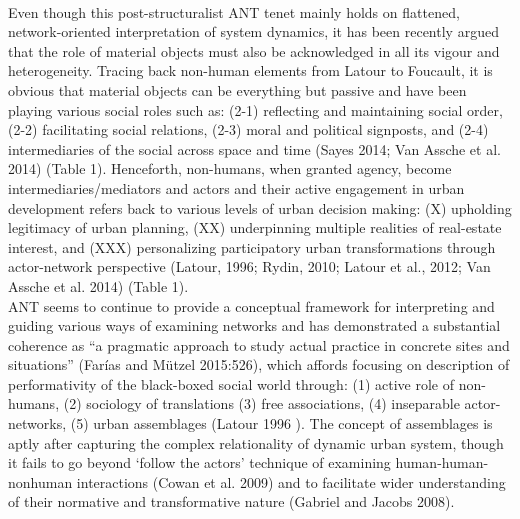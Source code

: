 \documentclass[11pt]{report}
\begin{document}
\\
Even though this post-structuralist ANT tenet mainly holds on flattened, network-oriented interpretation of system dynamics, it has been recently argued that the role of material objects must also be acknowledged in all its vigour and heterogeneity. Tracing back non-human elements from Latour to Foucault, it is obvious that material objects can be everything but passive and have been playing various social roles such as: (2-1) reflecting and maintaining social order, (2-2) facilitating social relations, (2-3) moral and political signposts, and (2-4) intermediaries of the social across space and time (Sayes 2014; Van Assche et al. 2014) (Table 1). Henceforth, non-humans, when granted agency, become intermediaries/mediators and actors and their active engagement in urban development refers back to various levels of urban decision making: (X) upholding legitimacy of urban planning, (XX) underpinning multiple realities of real-estate interest, and (XXX) personalizing participatory urban transformations through actor-network perspective (Latour, 1996; Rydin, 2010; Latour et al., 2012; Van Assche et al. 2014) (Table 1).
\\
ANT seems to continue to provide a conceptual framework for interpreting and guiding various ways of examining networks and has demonstrated a substantial coherence as “a pragmatic approach to study actual practice in concrete sites and situations” (Farías and Mützel 2015:526), which affords focusing on description of performativity of the black-boxed social world through: (1) active role of non-humans, (2) sociology of translations (3) free associations, (4) inseparable actor-networks, (5) urban assemblages (Latour 1996 ). The concept of assemblages is aptly after capturing the complex relationality of dynamic urban system, though it fails to go beyond ‘follow the actors’ technique of examining human-human-nonhuman interactions (Cowan et al. 2009) and to facilitate wider understanding of their normative and transformative nature (Gabriel and Jacobs 2008).
\\
\end{document}
